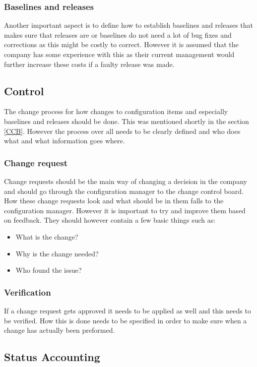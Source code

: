 \documentclass[a4paper]{article}
\begin{document}
\subsubsection{Baselines and releases}
Another important aspect is to define how to establish baselines and releases that makes sure that releases are or baselines do not need a lot of bug fixes and corrections as this might be costly to correct. However it is assumed that the company has some experience with this as their current management would further increase these costs if a faulty release was made.

\subsection{Control}
The change process for how changes to configuration items and especially baselines and releases should be done. This was mentioned shortly in the section \ref{CCB}. However the process over all needs to be clearly defined and who does what and what information goes where.

\subsubsection{Change request}
Change requests should be the main way of changing a decision in the company and should go through the configuration manager to the change control board. How these change requests look and what should be in them falls to the configuration manager. However it is important to try and improve them based on feedback. They should however contain a few basic things such as:
\begin{itemize}
\item What is the change?
\item Why is the change needed?
\item Who found the issue?
\end{itemize}

\subsubsection{Verification}
If a change request gets approved it needs to be applied as well and this needs to be verified. How this is done needs to be specified in order to make sure when a change has actually been preformed.

\subsection{Status Accounting}
\end{document}
